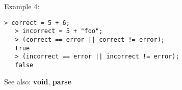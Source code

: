 \noindent Example 4: 
\begin{center}\begin{minipage}{14.8cm}\begin{Verbatim}[frame=single]
   > correct = 5 + 6;
   > incorrect = 5 + "foo";
   > (correct == error || correct != error);
   true
   > (incorrect == error || incorrect != error);
   false
\end{Verbatim}
\end{minipage}\end{center}
See also: \textbf{void}, \textbf{parse}
